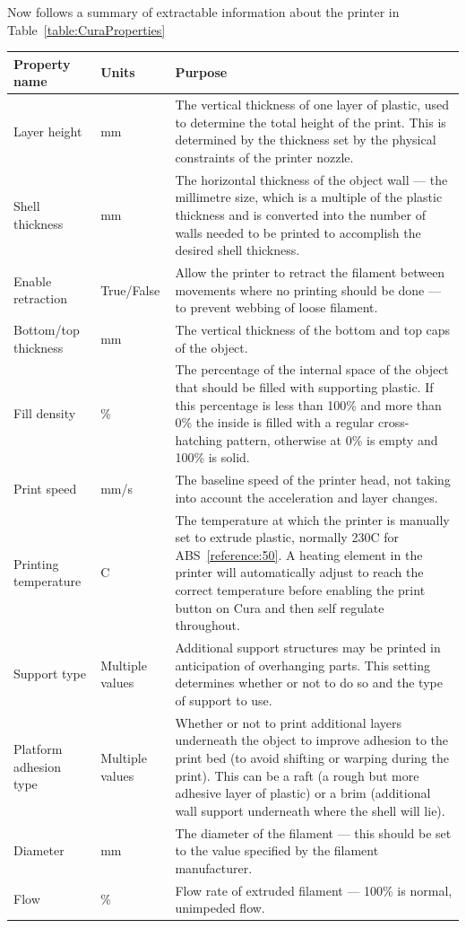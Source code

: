 \documentclass[11pt]{report} %
\begin{document}
Now follows a summary of extractable information about the printer in Table~\ref{table:CuraProperties}
\begin{table}[h]{\begin{minipage}{\textwidth}
\begin{tabular}{| p{3cm} | p{2cm} | p{8.5cm} |}
\hline

Property name & Units & Purpose\\\hline
Layer height & mm & The vertical thickness of one layer of plastic, used to determine the total height of the print. This is determined by the thickness set by the physical constraints of the printer nozzle.\\\hline
Shell thickness & mm & The horizontal thickness of the object wall --- the millimetre size, which is a multiple of the plastic thickness and is converted into the number of walls needed to be printed to accomplish the desired shell thickness.\\\hline
Enable retraction & True/False & Allow the printer to retract the filament between movements where no printing should be done --- to prevent webbing of loose filament.\\\hline
Bottom/top thickness & mm & The vertical thickness of the bottom and top caps of the object.\\\hline
Fill density & \% & The percentage of the internal space of the object that should be filled with supporting plastic. If this percentage is less than 100\% and more than 0\% the inside is filled with a regular cross-hatching pattern, otherwise at 0\% is empty and 100\% is solid.\\\hline
Print speed & mm/s & The baseline speed of the printer head, not taking into account the acceleration and layer changes.\\\hline
Printing temperature & \degree{}C & The temperature at which the printer is manually set to extrude plastic, normally 230\degree{}C for ABS~\ref{reference:50}. A heating element in the printer will automatically adjust to reach the correct temperature before enabling the print button on Cura and then self regulate throughout.\\\hline
Support type & Multiple values & Additional support structures may be printed in anticipation of overhanging parts. This setting determines whether or not to do so and the type of support to use.\\\hline
Platform adhesion type & Multiple values & Whether or not to print additional layers underneath the object to improve adhesion to the print bed (to avoid shifting or warping during the print). This can be a raft (a rough but more adhesive layer of plastic) or a brim (additional wall support underneath where the shell will lie).\\\hline
Diameter & mm & The diameter of the filament --- this should be set to the value specified by the filament manufacturer.\\\hline
Flow & \% & Flow rate of extruded filament --- 100\% is normal, unimpeded flow.\\\hline


\end{tabular}
\end{minipage}}
\end{table}
\end{document}
